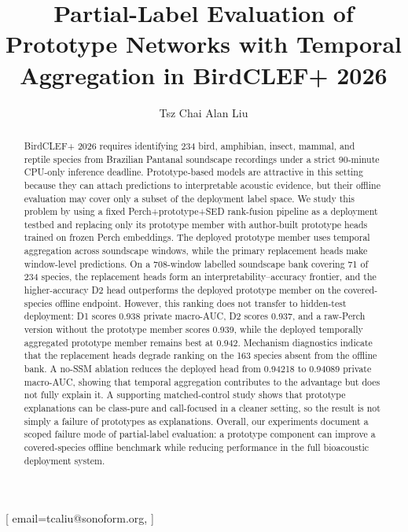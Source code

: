 \documentclass{ceurart}
\begin{document}


\title{Partial-Label Evaluation of Prototype Networks with Temporal Aggregation in BirdCLEF+ 2026}

\author[1]{Tsz Chai Alan Liu}[%
  email=tcaliu@sonoform.org,
]
\address[1]{Sonoform Labs, Ontario, Canada}

\begin{abstract}
BirdCLEF+ 2026 requires identifying 234 bird, amphibian, insect, mammal, and reptile species from Brazilian Pantanal soundscape recordings under a strict 90-minute CPU-only inference deadline. Prototype-based models are attractive in this setting because they can attach predictions to interpretable acoustic evidence, but their offline evaluation may cover only a subset of the deployment label space. We study this problem by using a fixed Perch+prototype+SED rank-fusion pipeline as a deployment testbed and replacing only its prototype member with author-built prototype heads trained on frozen Perch embeddings. The deployed prototype member uses temporal aggregation across soundscape windows, while the primary replacement heads make window-level predictions. On a 708-window labelled soundscape bank covering 71 of 234 species, the replacement heads form an interpretability--accuracy frontier, and the higher-accuracy D2 head outperforms the deployed prototype member on the covered-species offline endpoint. However, this ranking does not transfer to hidden-test deployment: D1 scores 0.938 private macro-AUC, D2 scores 0.937, and a raw-Perch version without the prototype member scores 0.939, while the deployed temporally aggregated prototype member remains best at 0.942. Mechanism diagnostics indicate that the replacement heads degrade ranking on the 163 species absent from the offline bank. A no-SSM ablation reduces the deployed head from 0.94218 to 0.94089 private macro-AUC, showing that temporal aggregation contributes to the advantage but does not fully explain it. A supporting matched-control study shows that prototype explanations can be class-pure and call-focused in a cleaner setting, so the result is not simply a failure of prototypes as explanations. Overall, our experiments document a scoped failure mode of partial-label evaluation: a prototype component can improve a covered-species offline benchmark while reducing performance in the full bioacoustic deployment system.

\end{abstract}
\end{document}
